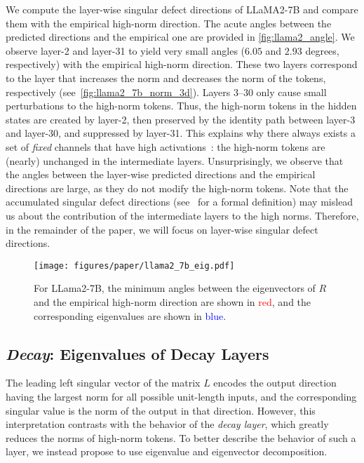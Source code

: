 We compute the layer-wise singular defect directions of LLaMA2-7B and compare them with the empirical high-norm direction.
The acute angles between the predicted directions and the empirical one are provided in \cref{fig:llama2_angle}.
We observe layer-2 and layer-31 to yield very small angles (\(6.05\) and \(2.93\) degrees, respectively) with the empirical high-norm direction.
These two layers correspond to the layer that increases the norm and decreases the norm of the tokens, respectively (see~\cref{fig:llama2_7b_norm_3d}).
Layers 3--30 only cause small perturbations to the high-norm tokens.
Thus, the high-norm tokens in the hidden states are created by layer-2, then preserved by the identity path between layer-3 and layer-30, and suppressed by layer-31.
This explains why there always exists a set of \emph{fixed} channels that have high activations~\cite{sun2024massive}: the high-norm tokens are (nearly) unchanged in the intermediate layers.
Unsurprisingly, we observe that the angles between the layer-wise predicted directions and the empirical directions are large, as they do not modify the high-norm tokens.
Note that the accumulated singular defect directions (see~\cite{wang2024sinder} for a formal definition) may mislead us about the contribution of the intermediate layers to the high norms.
Therefore, in the remainder of the paper, we will focus on layer-wise singular defect directions.

\begin{figure}[t]
    \begin{center}
        \centerline{\texttt{[image: figures/paper/llama2\_7b\_eig.pdf]}}
        \vspace{-0.5em}
        \caption{For LLama2-7B,
            the minimum angles between the eigenvectors of \(R\) and the empirical high-norm direction are shown in \textcolor{red}{red}, and the corresponding eigenvalues are shown in \textcolor{blue}{blue}.
        }\label{fig:llama2_7b_negeig}
        \vspace{-2.5em}
    \end{center}
\end{figure}

\subsection{\emph{Decay}: Eigenvalues of Decay Layers}\label{sec:eigenvalue}

The leading left singular vector of the matrix \(L\) encodes the output direction having the largest norm for all possible unit-length inputs, and the corresponding singular value is the norm of the output in that direction.
However, this interpretation contrasts with the behavior of the \emph{decay layer}, which greatly reduces the norms of high-norm tokens.
To better describe the behavior of such a layer, we instead propose to use eigenvalue and eigenvector decomposition.

